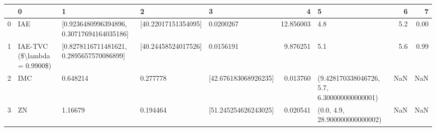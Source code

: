 \begin{tabular}{lllllrlrr}
\toprule
{} &                             0 &                                          1 &                    2 &                     3 &          4 &                                            5 &    6 &     7 \\
\midrule
0 &                           IAE &  [0.9236480996394896, 0.30717694164035186] &  [40.22017151354095] &             0.0200267 &  12.856003 &                                          4.8 &  5.2 &  0.00 \\
1 &  IAE-TVC (\$\textbackslash lambda = 0.9900\$) &   [0.8278116711481621, 0.2895657570086899] &  [40.24458524017526] &             0.0156191 &   9.876251 &                                          5.1 &  5.6 &  0.99 \\
2 &                           IMC &                                   0.648214 &             0.277778 &  [42.676183068926235] &   0.013760 &  (9.428170338046726, 5.7, 6.300000000000001) &  NaN &   NaN \\
3 &                            ZN &                                    1.16679 &             0.194464 &  [51.245254626243025] &   0.020541 &               (0.0, 4.9, 28.900000000000002) &  NaN &   NaN \\
\bottomrule
\end{tabular}
